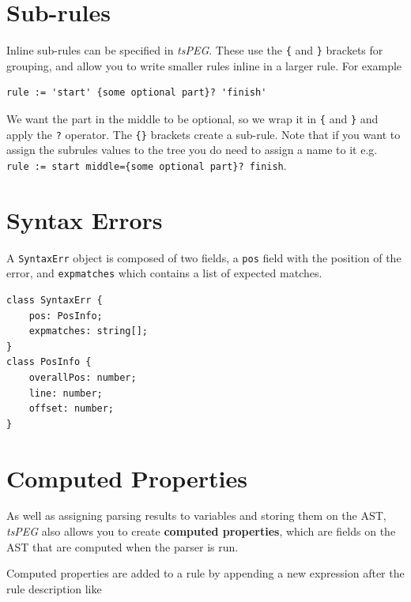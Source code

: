 \section{Sub-rules}\label{sub-rules}

Inline sub-rules can be specified in \emph{tsPEG}. These use the
\texttt{\{} and \texttt{\}} brackets for grouping, and allow you to
write smaller rules inline in a larger rule. For example

\begin{verbatim}
rule := 'start' {some optional part}? 'finish'
\end{verbatim}

We want the part in the middle to be optional, so we wrap it in
\texttt{\{} and \texttt{\}} and apply the \texttt{?} operator. The
\texttt{\{\}} brackets create a sub-rule. Note that if you want to
assign the subrules values to the tree you do need to assign a name to
it e.g.
\texttt{rule\ :=\ \textquotesingle{}start\textquotesingle{}\ middle=\{some\ optional\ part\}?\ \textquotesingle{}finish\textquotesingle{}}.

\hypertarget{syntax-errors}{\section{Syntax
Errors}\label{syntax-errors}}

A \texttt{SyntaxErr} object is composed of two fields, a \texttt{pos}
field with the position of the error, and \texttt{expmatches} which
contains a list of expected matches.

\begin{verbatim}
class SyntaxErr {
    pos: PosInfo;
    expmatches: string[];
}
class PosInfo {
    overallPos: number;
    line: number;
    offset: number;
}
\end{verbatim}

\hypertarget{computed-properties}{\section{Computed
Properties}\label{computed-properties}}

As well as assigning parsing results to variables and storing them on
the AST, \emph{tsPEG} also allows you to create \textbf{computed
properties}, which are fields on the AST that are computed when the
parser is run.

Computed properties are added to a rule by appending a new expression
after the rule description like

